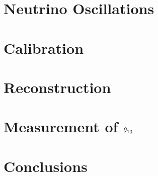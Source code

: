\documentclass{ucbthesis}
\begin{document}
\listoftodos

\chapter{Neutrino Oscillations}



\chapter{Calibration}
\label{ch:calibration}

\chapter{Reconstruction}






\chapter{Measurement of \texorpdfstring{$\theta_{13}$}{theta13}}

\chapter{Conclusions}

\appendix


\end{document}
